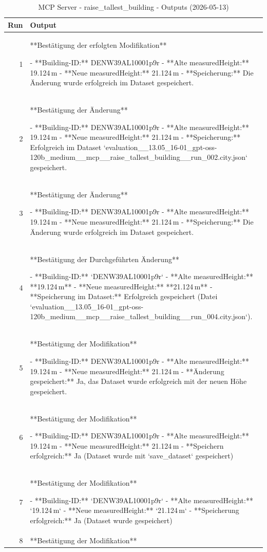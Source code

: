\documentclass[a4paper,11pt]{article}
\begin{document}
\begin{table}[ht]
\centering
\scriptsize
\caption{MCP Server - raise\_tallest\_building - Outputs (2026-05-13)}
\label{tab:mcp\_raise\_tallest\_building\_outputs\_2026-05-13}
\begin{tabular}{r p{12cm}}
\hline
Run & Output \\
\hline
1 & **Bestätigung der erfolgten Modifikation**

- **Building-ID:** DENW39AL10001p9r  
- **Alte measuredHeight:** 19.124 m  
- **Neue measuredHeight:** 21.124 m  
- **Speicherung:** Die Änderung wurde erfolgreich im Dataset gespeichert. \\
2 & **Bestätigung der Änderung**

- **Building-ID:** DENW39AL10001p9r  
- **Alte measuredHeight:** 19.124 m  
- **Neue measuredHeight:** 21.124 m  
- **Speicherung:** Erfolgreich im Dataset `evaluation\_\_13.05\_16-01\_gpt-oss-120b\_medium\_\_mcp\_\_raise\_tallest\_building\_\_run\_002.city.json` gespeichert. \\
3 & **Bestätigung der Änderung**

- **Building-ID:** DENW39AL10001p9r  
- **Alte measuredHeight:** 19.124 m  
- **Neue measuredHeight:** 21.124 m  
- **Speicherung:** Die Änderung wurde erfolgreich im Dataset gespeichert. \\
4 & **Bestätigung der Durchgeführten Änderung**

- **Building-ID:** `DENW39AL10001p9r`  
- **Alte measuredHeight:** **19.124 m**  
- **Neue measuredHeight:** **21.124 m**  
- **Speicherung im Dataset:** Erfolgreich gespeichert (Datei `evaluation\_\_13.05\_16-01\_gpt-oss-120b\_medium\_\_mcp\_\_raise\_tallest\_building\_\_run\_004.city.json`). \\
5 & **Bestätigung der Modifikation**

- **Building-ID:** DENW39AL10001p9r  
- **Alte measuredHeight:** 19.124 m  
- **Neue measuredHeight:** 21.124 m  
- **Änderung gespeichert:** Ja, das Dataset wurde erfolgreich mit der neuen Höhe gespeichert. \\
6 & **Bestätigung der Modifikation**

- **Building-ID:** DENW39AL10001p9r  
- **Alte measuredHeight:** 19.124 m  
- **Neue measuredHeight:** 21.124 m  
- **Speichern erfolgreich:** Ja (Dataset wurde mit `save\_dataset` gespeichert) \\
7 & **Bestätigung der Modifikation**

- **Building-ID:** `DENW39AL10001p9r`  
- **Alte measuredHeight:** `19.124 m`  
- **Neue measuredHeight:** `21.124 m`  
- **Speicherung erfolgreich:** Ja (Dataset wurde gespeichert) \\
8 & **Bestätigung der Modifikation**


\end{tabular}
\end{table}
\end{document}
